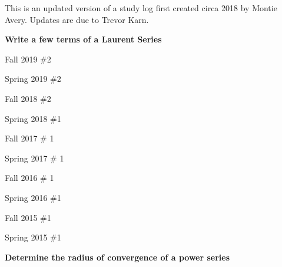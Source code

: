 \documentclass{article}
\begin{document}
\noindent This is an updated version of a study log first created circa 2018 by Montie Avery.
Updates are due to Trevor Karn.

\hfill

\textbf{Write a few terms of a Laurent Series}
\begin{todolist}
	\item Fall 2019 \#2
	\item Spring 2019 \#2
	\item Fall 2018 \#2
	\item Spring 2018 \#1
	\item Fall 2017 \# 1
	\item Spring 2017 \# 1
	\item Fall 2016 \# 1
	\item Spring 2016 \#1
	\item Fall 2015 \#1 
	\item Spring 2015 \#1
\end{todolist}

\textbf{Determine the radius of convergence of a power series}
\end{document}
